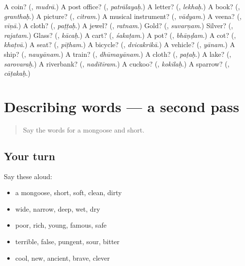 \begin{tcolorbox}[breakable,colback=teal!4,colframe=teal!35!black,title={Before you move on}]
A coin? (\textbf{}, \emph{mudrā}.) A post office? (\textbf{}, \emph{patrālayaḥ}.) A letter? (\textbf{}, \emph{lekhaḥ}.) A book? (\textbf{}, \emph{granthaḥ}.) A picture? (\textbf{}, \emph{citram}.) A musical instrument? (\textbf{}, \emph{vādyam}.) A veena? (\textbf{}, \emph{vīṇā}.) A cloth? (\textbf{}, \emph{paṭṭaḥ}.) A jewel? (\textbf{}, \emph{ratnam}.) Gold? (\textbf{}, \emph{suvarṇam}.) Silver? (\textbf{}, \emph{rajatam}.) Glass? (\textbf{}, \emph{kācaḥ}.) A cart? (\textbf{}, \emph{śakaṭam}.) A pot? (\textbf{}, \emph{bhāṇḍam}.) A cot? (\textbf{}, \emph{khaṭvā}.) A seat? (\textbf{}, \emph{pīṭham}.) A bicycle? (\textbf{}, \emph{dvicakrikā}.) A vehicle? (\textbf{}, \emph{yānam}.) A ship? (\textbf{}, \emph{nauyānam}.) A train? (\textbf{}, \emph{dhūmayānam}.) A cloth? (\textbf{}, \emph{paṭaḥ}.) A lake? (\textbf{}, \emph{sarovaraḥ}.) A riverbank? (\textbf{}, \emph{nadītīram}.) A cuckoo? (\textbf{}, \emph{kokilaḥ}.) A sparrow? (\textbf{}, \emph{cāṭakaḥ}.)
\end{tcolorbox}
\section[(dialogue)]{Describing words — a second pass}

\label{lesson:SA-R129-second-pass-describing-words}



\begin{quote}
Say the words for a mongoose and short.
\end{quote}

\subsection*{Your turn}
Say these aloud:

\begin{itemize}
\raggedright
  \item a mongoose, short, soft, clean, dirty
  \item wide, narrow, deep, wet, dry
  \item poor, rich, young, famous, safe
  \item terrible, false, pungent, sour, bitter
  \item cool, new, ancient, brave, clever
\end{itemize}

